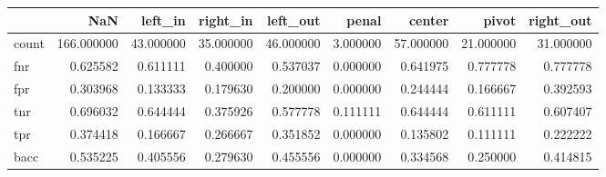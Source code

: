 \begin{tabular}{lrrrrrrrr}
\toprule
{} &         NaN &    left\_in &   right\_in &   left\_out &     penal &     center &      pivot &  right\_out \\
\midrule
count &  166.000000 &  43.000000 &  35.000000 &  46.000000 &  3.000000 &  57.000000 &  21.000000 &  31.000000 \\
fnr   &    0.625582 &   0.611111 &   0.400000 &   0.537037 &  0.000000 &   0.641975 &   0.777778 &   0.777778 \\
fpr   &    0.303968 &   0.133333 &   0.179630 &   0.200000 &  0.000000 &   0.244444 &   0.166667 &   0.392593 \\
tnr   &    0.696032 &   0.644444 &   0.375926 &   0.577778 &  0.111111 &   0.644444 &   0.611111 &   0.607407 \\
tpr   &    0.374418 &   0.166667 &   0.266667 &   0.351852 &  0.000000 &   0.135802 &   0.111111 &   0.222222 \\
bacc  &    0.535225 &   0.405556 &   0.279630 &   0.455556 &  0.000000 &   0.334568 &   0.250000 &   0.414815 \\
\bottomrule
\end{tabular}
